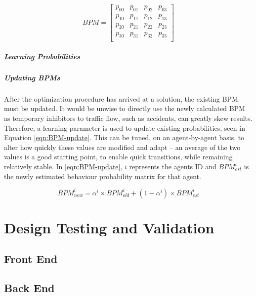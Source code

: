 \documentclass{report}
\begin{document}
\[
{BPM} =
    \begin{bmatrix}
    p_{00} & p_{01} & p_{02} & p_{03} \\
    p_{10} & p_{11} & p_{12} & p_{13} \\
p_{20} & p_{21} & p_{22} & p_{23} \\
p_{30} & p_{31} & p_{32} & p_{33} \\
    \end{bmatrix}
\]

\paragraph{Learning Probabilities}

\paragraph{Updating BPMs}
After the optimization procedure has arrived at a solution, the existing BPM must be updated. 
It would be unwise to directly use the newly calculated BPM as temporary inhibitors to traffic flow, such as accidents, can greatly skew results. 
Therefore, a learning parameter is used to update existing probabilities, seen in Equation \ref{eqn:BPM-update}. 
This can be tuned, on an agent-by-agent basis, to alter how quickly these values are modified and adapt – an average of the two values is a good starting point, to enable quick transitions, while remaining relatively stable. 
In \ref{eqn:BPM-update}, $i$ represents the agents ID and $BPM_{est}^{i}$ is the newly estimated behaviour probability matrix for that agent.

\begin{equation}
    BPM_{new}^{i} = \alpha^{i} \times BPM_{old}^{i} + (1 - \alpha^{i}) \times BPM_{est}^{i}
    \label{eqn:BPM-update}
\end{equation}

\newpage
\chapter{Design Testing and Validation}

\section{Front End}

\section{Back End}
\end{document}

